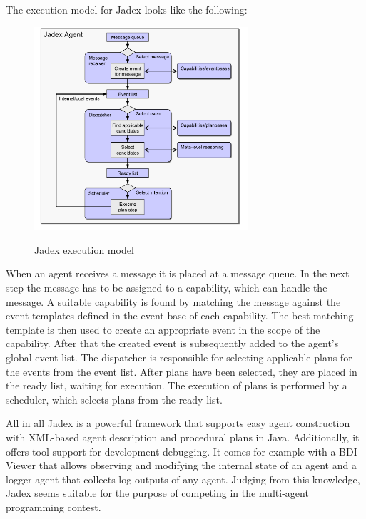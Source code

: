 The execution model for Jadex looks like the following:
\begin{figure}
	\centering
	\includegraphics[width=300px]{images/Jadex_execution_model.png}
	\label{fig4}
	\caption{Jadex execution model \cite{pokahr_jadex_2005}}
\end{figure}
\newline
When an agent receives a message it is placed at a message queue.
In the next step the message has to be assigned to a capability, which can handle the message.
A suitable capability is found by matching the message against the event templates defined in the event base of each capability.
The best matching template is then used to create an appropriate event in the scope of the capability.
After that the created event is subsequently added to the agent's global event list.
The dispatcher is responsible for selecting applicable plans for the events from the event list.
After plans have been selected, they are placed in the ready list, waiting for execution.
The execution of plans is performed by a scheduler, which selects plans from the ready list.\cite{pokahr_jadex_2005}

All in all Jadex is a powerful framework that supports easy agent construction with XML-based agent description and procedural plans in Java.
Additionally, it offers tool support for development debugging.
It comes for example with a BDI-Viewer that allows observing and modifying the internal state of an agent and a logger agent that collects log-outputs of any agent.
Judging from this knowledge, Jadex seems suitable for the purpose of competing in the multi-agent programming contest.
